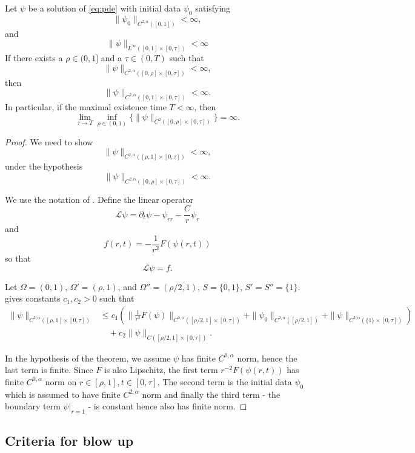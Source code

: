 \documentclass{amsart}
\begin{document}
\begin{lemma}
\label{lem:apriori_bounds}
Let \(\psi\) be a solution of \eqref{eq:pde} with initial data \(\psi_0\) satisfying
\[
\|\psi_0\|_{C^{2,\alpha}([0, 1])} < \infty,
\]
and
\[
\|\psi\|_{L^{\infty} ([0, 1] \times [0, \tau])} < \infty
\]
If there exists a \(\rho \in (0, 1]\) and a \(\tau \in (0, T)\) such that
\[
\|\psi\|_{C^{2,\alpha}([0, \rho] \times [0, \tau])} < \infty,
\]
then
\[
\|\psi\|_{C^{2,\alpha}([0, 1] \times [0, \tau])} < \infty.
\]
In particular, if the maximal existence time \(T < \infty\), then
\[
\lim_{\tau\to T} \inf_{\rho \in (0, 1)} \{\|\psi\|_{C^2([0, \rho] \times [0, \tau])}\} = \infty.
\]
\end{lemma}

\begin{proof}
We need to show
\[
\|\psi\|_{C^{2,\alpha}([\rho, 1] \times [0, \tau])} < \infty,
\]
under the hypothesis
\[
\|\psi\|_{C^{2,\alpha}([0, \rho] \times [0, \tau])} < \infty.
\]

We use the notation of \cite[Theorem 10.1]{Ladyzhenskaja:/1967}. Define the linear operator
\[
\mathcal{L} \psi = \partial_t \psi - \psi_{rr} - \frac{C}{r} \psi_r
\]
and
\[
f(r, t) = -\frac{1}{r^2} F(\psi(r, t))
\]
so that
\[
\mathcal{L} \psi = f.
\]

Let \(\Omega = (0, 1)\), \(\Omega' = (\rho, 1)\), and \(\Omega'' = (\rho/2, 1)\), \(S = \{0, 1\}\), \(S' = S'' = \{1\}\). \cite[Theorem 10.1]{Ladyzhenskaja:/1967} gives constants \(c_1, c_2 > 0\) such that
\[
\begin{split}
\|\psi\|_{C^{2,\alpha}([\rho, 1] \times [0, \tau])} &\leq c_1 \left(\|\tfrac{1}{r^2} F(\psi)\|_{C^{0,\alpha}([\rho/2, 1] \times [0, \tau])} + \|\psi_0\|_{C^{2,\alpha}([\rho/2, 1])} + \|\psi\|_{C^{2,\alpha}(\{1\} \times [0, \tau])} \right) \\
&\quad + c_2 \|\psi\|_{C([\rho/2, 1] \times [0, \tau])}.
\end{split}
\]

In the hypothesis of the theorem, we assume \(\psi\) has finite \(C^{0,\alpha}\) norm, hence the last term is finite. Since \(F\) is also Lipschitz, the first term \(r^{-2} F(\psi(r, t))\) has finite \(C^{0,\alpha}\) norm on \(r \in [\rho, 1], t \in [0, \tau]\). The second term is the initial data \(\psi_0\) which is assumed to have finite \(C^{2,\alpha}\) norm and finally the third term - the boundary term \(\psi|_{r=1}\) - is constant hence also has finite norm.
\end{proof}

\subsection{Criteria for blow up}
\end{document}
